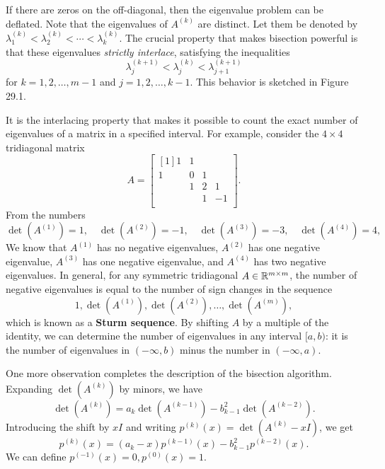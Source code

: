 If there are zeros on the off-diagonal, then the eigenvalue problem can be deflated. Note that the eigenvalues of $ A^{(k)} $ are distinct. Let them be denoted by $ \lambda _1 ^{(k)}< \lambda _2^{(k)}< \cdots < \lambda _k^{(k)} $. The crucial property that makes bisection powerful is that these eigenvalues {\it strictly interlace}, satisfying the inequalities 
\[
    \lambda _j ^{(k+1)} < \lambda _j ^{(k)} < \lambda _{j+1}^{(k+1)}
\]
for $ k=1,2,\ldots ,m-1 $ and $ j=1,2,\ldots , k-1 $. This behavior is sketched in Figure 29.1.  

It is the interlacing property that makes it possible to count the exact number of eigenvalues of a matrix in a specified interval. For example, consider the $ 4\times 4 $ tridiagonal matrix 
\[
    A =\begin{bmatrix}[1] 
        1 & 1 &  &   \\
        1 & 0 & 1 &   \\
         & 1 & 2 &  1 \\
         &  & 1 &  -1 \\
    \end{bmatrix}. 
\] 
From the numbers 
\[
    \det (A^{(1)}) = 1, \quad \det (A^{(2)}) = -1, \quad \det (A^{(3)}) = -3, \quad \det (A^{(4)}) = 4, 
\]
We know that $ A^{( 1)} $ has no negative eigenvalues, $ A^{(2)} $ has one negative eigenvalue, $ A^{(3)} $ has one negative eigenvalue, and $ A^{(4)} $ has two negative eigenvalues. In general, for any symmetric tridiagonal $ A\in \mathbb{R}^{m\times m} $, the number of negative eigenvalues is equal to the number of sign changes in the sequence 
\[
    1, \det (A^{(1)}), \det (A^{(2)}), \ldots , \det (A^{(m)}), 
\]
which is known as a \textbf{Sturm sequence}. By shifting $ A $ by a multiple of the identity, we can determine the number of eigenvalues in any interval $ [a,b) $: it is the number of eigenvalues in $ (-\infty, b) $ minus the number in $ (-\infty,a) $.  

One more observation completes the description of the bisection algorithm. Expanding $ \det (A^{(k)}) $ by minors, we have 
\[
    \det (A^{(k)}) = a_k \det (A^{(k-1)}) - b_{k-1}^2 \det (A^{(k-2)} ).        
\]
Introducing the shift by $ xI $ and writing $ p^{(k)}(x) = \det (A^{(k)}-xI) $, we get 
\begin{equation}
\label{eq: bisection induction formula }
        p^{(k)}(x) = (a_k -x) p^{(k-1)}(x) - b_{ k-1 } ^2 p^{(k-2)}(x). 
\end{equation}
We can define $ p^{(-1)}(x) = 0, p^{(0)}(x) = 1 $.  


